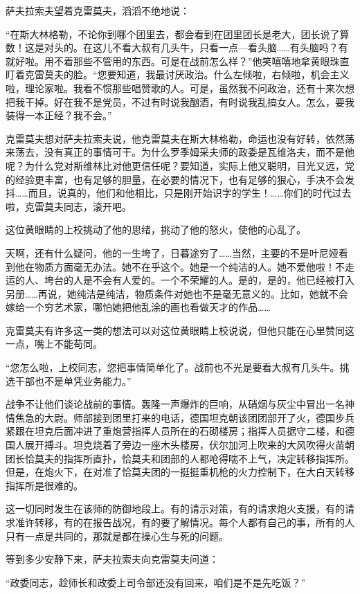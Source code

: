 萨夫拉索夫望着克雷莫夫，滔滔不绝地说：

“在斯大林格勒，不论你到哪个团里去，都会看到在团里团长是老大，团长说了算数！这是对头的。在这儿不看大叔有几头牛，只看一点—看头脑……有头脑吗？有就好啦。用不着那些不管用的东西。可是在战前怎么样？”他笑嘻嘻地拿黄眼珠直盯着克雷莫夫的脸。“您要知道，我最讨厌政治。什么左倾啦，右倾啦，机会主义啦，理论家啦。我看不惯那些唱赞歌的人。可是，虽然我不问政治，还有十来次想把我干掉。好在我不是党员，不过有时说我酗酒，有时说我乱搞女人。怎么，要我装得一本正经？我不会。”

克雷莫夫想对萨夫拉索夫说，他克雷莫夫在斯大林格勒，命运也没有好转，依然荡来荡去，没有真正的事情可干。为什么罗季姆采夫师的政委是瓦维洛夫，而不是他呢？为什么党对斯维林比对他更信任呢？要知道，实际上他又聪明，目光又远，党的经验更丰富，也有足够的胆量，在必要的情况下，也有足够的狠心，手决不会发抖……而且，说真的，他们和他相比，只是刚开始识字的学生！……你们的时代过去啦，克雷莫夫同志，滚开吧。

这位黄眼睛的上校挑动了他的思绪，挑动了他的怒火，使他的心乱了。

天啊，还有什么疑问，他的一生垮了，日暮途穷了……当然，主要的不是叶尼娅看到他在物质方面毫无办法。她不在乎这个。她是一个纯洁的人。她不爱他啦！不走运的人、垮台的人是不会有人爱的。一个不荣耀的人。是的，是的，他已经被打入另册……再说，她纯洁是纯洁，物质条件对她也不是毫无意义的。比如，她就不会嫁给一个穷艺术家，哪怕她把他乱涂的画也看做天才的作品……

克雷莫夫有许多这一类的想法可以对这位黄眼睛上校说说，但他只能在心里赞同这一点，嘴上不能苟同。

“您怎么啦，上校同志，您把事情简单化了。战前也不光是要看大叔有几头牛。挑选干部也不是单凭业务能力。”

战争不让他们谈论战前的事情。轰隆一声爆炸的巨响，从硝烟与灰尘中冒出一名神情焦急的大尉。师部接到团里打来的电话，德国坦克朝该团团部开了火，德国步兵紧跟在坦克后面冲进了重炮营指挥人员所在的石砌楼房；指挥人员据守二楼，和德国人展开搏斗。坦克烧着了旁边一座木头楼房，伏尔加河上吹来的大风吹得火苗朝团长恰莫夫的指挥所直扑，恰莫夫和团部的人都呛得喘不上气，决定转移指挥所。但是，在炮火下，在对准了恰莫夫团的一挺挺重机枪的火力控制下，在大白天转移指挥所是很难的。

这一切同时发生在该师的防御地段上。有的请示对策，有的请求炮火支援，有的请求准许转移，有的在报告战况，有的要了解情况。每个人都有自己的事，所有的人只有一点是共同的，那就是都在操心生与死的问题。

等到多少安静下来，萨夫拉索夫向克雷莫夫问道：

“政委同志，趁师长和政委上司令部还没有回来，咱们是不是先吃饭？”

